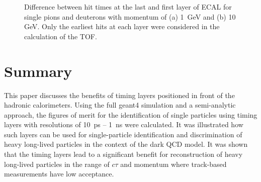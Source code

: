 \documentclass[final,1p,11pt]{elsarticle}
\begin{document}
\begin{figure}
\begin{center}
\end{center}
\caption{Difference between hit times at the last and first layer of ECAL for single pions and deuterons  with 
 momentum of (a) 1~GeV  and (b) 10 GeV. Only the earliest hits at each layer were considered in the  calculation of the TOF. }
\label{fig:timediff}
\end{figure}


\clearpage 





%

%


\section{Summary}

This paper discusses the benefits of timing layers positioned in front of the hadronic calorimeters.
Using the full {\sc geant}4 simulation and a semi-analytic approach,
the figures of merit for the identification of single particles
using timing layers with resolutions of 10~ps -- 1~ns were calculated.
It was illustrated 
how such layers can be used for single-particle identification and
discrimination of heavy long-lived particles in the context of the dark QCD model.
It was shown that the timing layers lead to a significant benefit for reconstruction of heavy long-lived particles 
in the range of $c\tau$ and momentum where track-based measurements have low acceptance.
\end{document}

